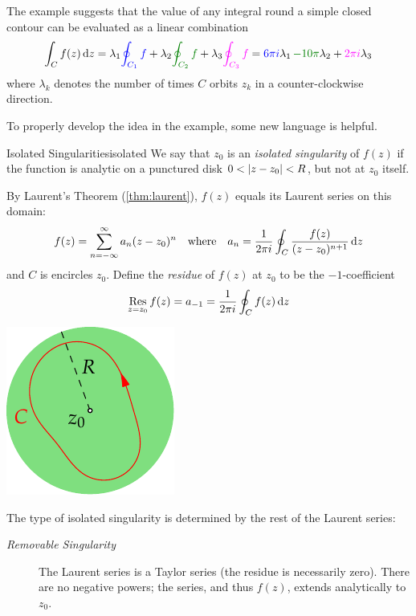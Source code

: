 The example suggests that the value of any integral round a simple closed contour can be evaluated as a linear combination
\[
	\int_C f(z)\,\dz
	=\lambda_1\textcolor{blue}{\oint_{C_1}f}
	+\lambda_2\textcolor{Green}{\oint_{C_2}f}
	+\lambda_3\textcolor{Magenta}{\oint_{C_3}f}
	=\textcolor{blue}{6\pi i}\lambda_1
	\,\textcolor{Green}{-10\pi}\lambda_2
	+\textcolor{Magenta}{2\pi i}\lambda_3
\]
where $\lambda_k$ denotes the number of times $C$ orbits $z_k$ in a counter-clockwise direction.\goodbreak


To properly develop the idea in the example, some new language is helpful.

\begin{defn}{Isolated Singularities}{isolated}
	We say that $z_0$ is an \emph{isolated singularity} of $f(z)$ if the function is analytic on a punctured disk $0<\left| z-z_0\right|<R$, but not at $z_0$ itself.\par
	\begin{minipage}[t]{0.75\linewidth}\vspace{-2pt}
		By Laurent's Theorem (\ref{thm:laurent}), $f(z)$ equals its Laurent series on this domain:
		\[
			f(z)=\sum_{n=-\infty}^\infty a_n(z-z_0)^n
			\quad \text{where}\quad 
			a_n=\frac 1{2\pi i}\oint_C\frac{f(z)}{(z-z_0)^{n+1}}\,{\mathrm{d} z}
		\]
		and $C$ is encircles $z_0$. Define the \emph{residue} of $f(z)$ at $z_0$ to be the $-1$-coefficient
		\[
			\operatorname*{Res}_{z=z_0}f(z)=a_{-1}=\frac 1{2\pi i}\oint_C f(z)\,{\mathrm{d} z}
		\]
	\end{minipage}
	\hfill
	\begin{minipage}[t]{0.24\linewidth}\vspace{-15pt}
		\flushright\includegraphics[scale=0.95]{isolatedsing}
	\end{minipage}\bigbreak
	The type of isolated singularity is determined by the rest of the Laurent series:
	\begin{description}
		\item[\normalfont\emph{Removable Singularity}] The Laurent series is a Taylor series (the residue is necessarily zero). There are no negative powers; the series, and thus $f(z)$, extends analytically to $z_0$. 

\end{description}
\end{defn}
